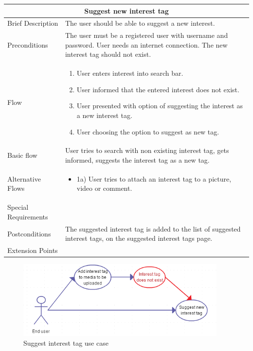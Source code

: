\begin{minipage}{\linewidth}
\begin{tabular}{|l|p{85mm}|}
  \hline
  \multicolumn{2}{|c|}{\cellcolor{gray!25} \textbf{Suggest new interest tag}} \\
  \hline
  Brief Description & The user should be able to suggest a new interest.\\
  Preconditions & The user must be a registered user with username and password. User needs an internet connection. The new interest tag should not exist.\\
  Flow &
    \begin{enumerate}
      \item User enters interest into search bar.
      \item User informed that the entered interest does not exist.
      \item User presented with option of suggesting the interest as a new interest tag.
      \item User choosing the option to suggest as new tag.
    \end{enumerate} \\
  Basic flow & User tries to search with non existing interest tag, gets informed, suggests the interest tag as a new tag.\\
  Alternative Flows & 
    \begin{itemize}
      \item 1a) User tries to attach an interest tag to a picture, video or comment.
    \end{itemize} \\
  Special Requirements & \\
  Postconditions & The suggested interest tag is added to the list of suggested interest tags, on the suggested interest tags page.\\
  Extension Points & \\
  \hline
\end{tabular}
\end{minipage}

\begin{figure}[ht!]
\centering
\includegraphics[width=105mm]{./SystemRequirements/img/suggesttagUC.png}
\caption{Suggest interest tag use case \label{fig:SysReqUseCasesSuggestTag}}
\end{figure}

